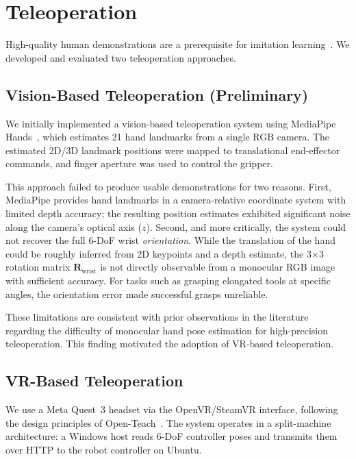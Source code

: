 \documentclass[conference]{IEEEtran}
\begin{document}
\section{Teleoperation}
\label{sec:teleop}

High-quality human demonstrations are a prerequisite for imitation learning~\cite{mandlekar2021matters}. We developed and evaluated two teleoperation approaches.

\subsection{Vision-Based Teleoperation (Preliminary)}
\label{sec:teleop_vision}

We initially implemented a vision-based teleoperation system using MediaPipe Hands~\cite{zhang2020mediapipe_hands, lugaresi2019mediapipe}, which estimates 21 hand landmarks from a single RGB camera. The estimated 2D/3D landmark positions were mapped to translational end-effector commands, and finger aperture was used to control the gripper.

This approach failed to produce usable demonstrations for two reasons. First, MediaPipe provides hand landmarks in a camera-relative coordinate system with limited depth accuracy; the resulting position estimates exhibited significant noise along the camera's optical axis ($z$). Second, and more critically, the system could not recover the full 6-DoF wrist \emph{orientation}. While the translation of the hand could be roughly inferred from 2D keypoints and a depth estimate, the 3$\times$3 rotation matrix $\mathbf{R}_\mathrm{wrist}$ is not directly observable from a monocular RGB image with sufficient accuracy. For tasks such as grasping elongated tools at specific angles, the orientation error made successful grasps unreliable.

These limitations are consistent with prior observations in the literature~\cite{handa2020dexpilot} regarding the difficulty of monocular hand pose estimation for high-precision teleoperation. This finding motivated the adoption of VR-based teleoperation.

\subsection{VR-Based Teleoperation}
\label{sec:teleop_vr}

We use a Meta Quest~3 headset via the OpenVR/SteamVR interface, following the design principles of Open-Teach~\cite{iyer2024openteach}. The system operates in a split-machine architecture: a Windows host reads 6-DoF controller poses and transmits them over HTTP to the robot controller on Ubuntu.
\end{document}
